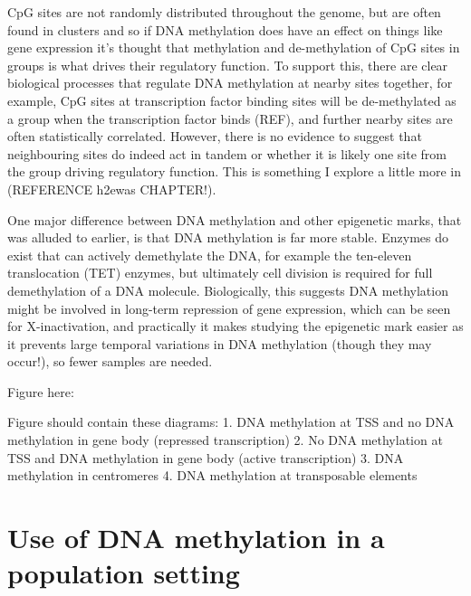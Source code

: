 \documentclass[11pt,twoside]{bristolthesis}
\begin{document}
CpG sites are not randomly distributed throughout the genome, but are often found in clusters and so if DNA methylation does have an effect on things like gene expression it's thought that methylation and de-methylation of CpG sites in groups is what drives their regulatory function. To support this, there are clear biological processes that regulate DNA methylation at nearby sites together, for example, CpG sites at transcription factor binding sites will be de-methylated as a group when the transcription factor binds (REF), and further nearby sites are often statistically correlated. However, there is no evidence to suggest that neighbouring sites do indeed act in tandem or whether it is likely one site from the group driving regulatory function. This is something I explore a little more in (REFERENCE h2ewas CHAPTER!).

One major difference between DNA methylation and other epigenetic marks, that was alluded to earlier, is that DNA methylation is far more stable. Enzymes do exist that can actively demethylate the DNA, for example the ten-eleven translocation (TET) enzymes, but ultimately cell division is required for full demethylation of a DNA molecule. Biologically, this suggests DNA methylation might be involved in long-term repression of gene expression, which can be seen for X-inactivation, and practically it makes studying the epigenetic mark easier as it prevents large temporal variations in DNA methylation (though they may occur!), so fewer samples are needed.

Figure here:

Figure should contain these diagrams:
1. DNA methylation at TSS and no DNA methylation in gene body (repressed transcription)
2. No DNA methylation at TSS and DNA methylation in gene body (active transcription)
3. DNA methylation in centromeres
4. DNA methylation at transposable elements

\hypertarget{dnam-phs}{%
\section{Use of DNA methylation in a population setting~}\label{dnam-phs}}
\end{document}
